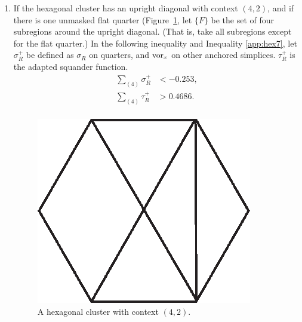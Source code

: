 \begin{enumerate}
\item\label{app:hex6} If the hexagonal cluster has an upright
diagonal with context $(4,2)$, and if there is one unmasked flat
quarter (Figure~\ref{fig:hex42a}, let $\{F\}$ be the set of four
subregions around the upright diagonal. (That is, take all
subregions except for the flat quarter.) In the following
inequality and Inequality \ref{app:hex7}, let $\sigma_R^+$ be
defined as $\sigma_R$ on quarters, and $\operatorname{vor}_x$ on other anchored
simplices.  $\tau_R^+$ is the adapted squander function.
    $$
    \begin{array}{lll}
    \sum_{(4)}\sigma_R^+ &< -0.253,\\
    \sum_{(4)}\tau_R^+ &> 0.4686.\\
    \end{array}
    $$
\begin{figure}[htb]
  \centering
  \includegraphics{PS/hex42a.eps}
  \caption{A hexagonal cluster with context $(4,2)$.}
  \label{fig:hex42a}
\end{figure}



\end{enumerate}
